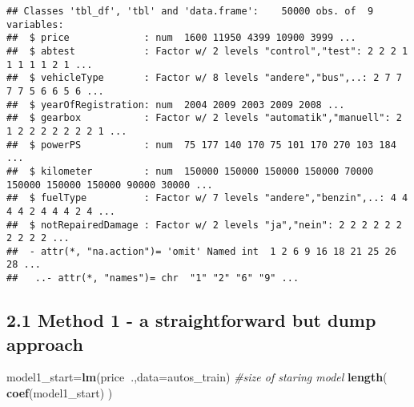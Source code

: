 \documentclass[]{article}
\newenvironment{Shaded}{\begin{snugshade}}{\end{snugshade}}
\newcommand{\CommentTok}[1]{\textcolor[rgb]{0.56,0.35,0.01}{\textit{#1}}}
\newcommand{\DataTypeTok}[1]{\textcolor[rgb]{0.13,0.29,0.53}{#1}}
\newcommand{\DecValTok}[1]{\textcolor[rgb]{0.00,0.00,0.81}{#1}}
\newcommand{\KeywordTok}[1]{\textcolor[rgb]{0.13,0.29,0.53}{\textbf{#1}}}
\newcommand{\NormalTok}[1]{#1}
\newcommand{\OperatorTok}[1]{\textcolor[rgb]{0.81,0.36,0.00}{\textbf{#1}}}
\newcommand{\StringTok}[1]{\textcolor[rgb]{0.31,0.60,0.02}{#1}}
\begin{document}
\begin{verbatim}
## Classes 'tbl_df', 'tbl' and 'data.frame':    50000 obs. of  9 variables:
##  $ price             : num  1600 11950 4399 10900 3999 ...
##  $ abtest            : Factor w/ 2 levels "control","test": 2 2 2 1 1 1 1 1 2 1 ...
##  $ vehicleType       : Factor w/ 8 levels "andere","bus",..: 2 7 7 7 7 5 6 6 5 6 ...
##  $ yearOfRegistration: num  2004 2009 2003 2009 2008 ...
##  $ gearbox           : Factor w/ 2 levels "automatik","manuell": 2 1 2 2 2 2 2 2 2 1 ...
##  $ powerPS           : num  75 177 140 170 75 101 170 270 103 184 ...
##  $ kilometer         : num  150000 150000 150000 150000 70000 150000 150000 150000 90000 30000 ...
##  $ fuelType          : Factor w/ 7 levels "andere","benzin",..: 4 4 4 4 2 4 4 4 2 4 ...
##  $ notRepairedDamage : Factor w/ 2 levels "ja","nein": 2 2 2 2 2 2 2 2 2 2 ...
##  - attr(*, "na.action")= 'omit' Named int  1 2 6 9 16 18 21 25 26 28 ...
##   ..- attr(*, "names")= chr  "1" "2" "6" "9" ...
\end{verbatim}

\begin{Shaded}
\end{Shaded}

\hypertarget{method-1---a-straightforward-but-dump-approach}{%
\subsection{2.1 Method 1 - a straightforward but dump
approach}\label{method-1---a-straightforward-but-dump-approach}}

\begin{Shaded}
\begin{Highlighting}[]
\NormalTok{model1_start=}\KeywordTok{lm}\NormalTok{(price}\OperatorTok{~}\NormalTok{.,}\DataTypeTok{data=}\NormalTok{autos_train)}
\CommentTok{#size of staring model}
\KeywordTok{length}\NormalTok{( }\KeywordTok{coef}\NormalTok{(model1_start) )}
\end{Highlighting}
\end{Shaded}
\end{document}
